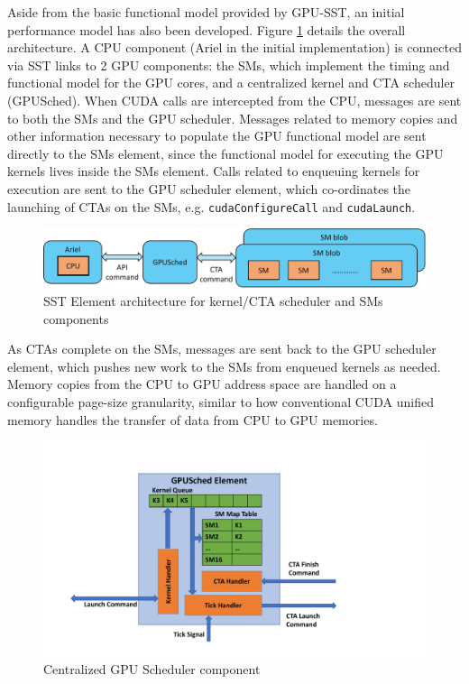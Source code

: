 Aside from the basic functional model provided by GPU-SST, an initial
performance model has also been developed. Figure \ref{fig:gpu_sched} details
the overall architecture. A CPU component (Ariel in the initial implementation)
is connected via SST links to 2 GPU components: the SMs, which implement the
timing and functional model for the GPU cores, and a centralized kernel and CTA
scheduler (GPUSched). When CUDA calls are intercepted from the CPU, messages are
sent to both the SMs and the GPU scheduler. Messages related to memory copies
and other information necessary to populate the GPU functional model are sent
directly to the SMs element, since the functional model for executing the GPU
kernels lives inside the SMs element. Calls related to enqueuing kernels for
execution are sent to the GPU scheduler element, which co-ordinates the
launching of CTAs on the SMs, e.g. \texttt{cudaConfigureCall} and
\texttt{cudaLaunch}.


   \begin{figure}[!htb]
      \centering
      \setlength{\abovecaptionskip}{6pt plus 1pt minus 1pt}
      \includegraphics[width=.90\textwidth,keepaspectratio]{figures/2_1-eps-converted-to-crop.pdf}
      \captionsetup{width=.90\textwidth}
      \caption{SST Element architecture for kernel/CTA scheduler and SMs components}
      \label{fig:gpu_sched}
   \end{figure}


As CTAs complete on the SMs, messages are sent back to the GPU scheduler
element, which pushes new work to the SMs from enqueued kernels as needed.
Memory copies from the CPU to GPU address space are handled on a configurable
page-size granularity, similar to how conventional CUDA unified memory handles
the transfer of data from CPU to GPU memories.

   \begin{figure}[!htb]
      \centering
      \setlength{\abovecaptionskip}{6pt plus 1pt minus 1pt}
      \includegraphics[width=.90\textwidth,keepaspectratio]{figures/scheduler.pdf}
      \captionsetup{width=.75\textwidth}
      \caption{Centralized GPU Scheduler component}
      \label{fig:sched}
   \end{figure}

